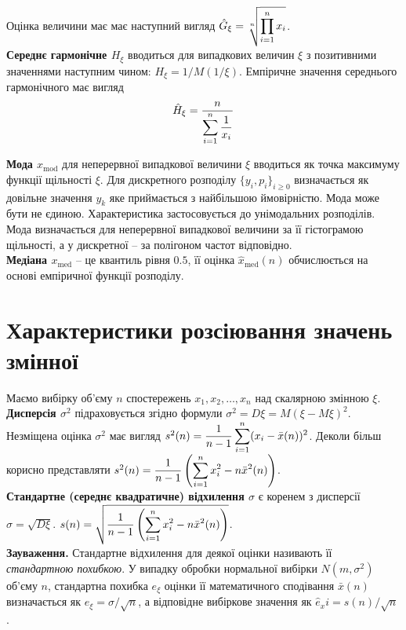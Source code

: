 Оцінка величини має має наступний вигляд $\hat{G}_\xi = \sqrt[n]{\displaystyle\prod\limits_{i=1}^n x_i}$. \\

\textbf{Середнє гармонічне $H_\xi$} вводиться для випадкових величин $\xi$ з позитивними значеннями наступним чином: $H_\xi = 1 / M(1 / \xi)$. Емпіричне значення середнього гармонічного має вигляд \[ \hat{H}_\xi = \dfrac{n}{\displaystyle\sum\limits_{i=1}^n \frac{1}{x_i}} \]

\textbf{Мода $x_{\text{mod}}$} для неперервної випадкової величини $\xi$ вводиться як точка максимуму функції щільності $\xi$. Для дискретного розподілу $\{ y_i, p_i \}_{i \ge 0}$ визначається як довільне значення $y_k$ яке приймається з найбільшою ймовірністю. Мода може бути не єдиною. Характеристика застосовується до унімодальних розподілів. Мода визначається для неперервної випадкової величини за її гістограмою щільності, а у дискретної -- за полігоном частот відповідно.\\

\textbf{Медіана $x_{\text{med}}$} -- це квантиль рівня $0.5$, її оцінка $\hat{x}_{\text{med}}(n)$ обчислюється на основі емпіричної функції розподілу. 

\section{Характеристики розсіювання значень змінної}

Маємо вибірку об'єму $n$ спостережень $x_1, x_2, \ldots, x_n$ над скалярною змінною $\xi$. \\

\textbf{Дисперсія $\sigma^2$} підраховується згідно формули $\sigma^2 = D\xi = M(\xi - M \xi)^2$. Незміщена оцінка $\sigma^2$ має вигляд $s^2(n) = \dfrac{1}{n-1} \displaystyle\sum\limits_{i=1}^n (x_i - \bar{x}(n))^2$. Деколи більш корисно представляти $s^2(n) = \dfrac{1}{n-1} \left(\displaystyle\sum\limits_{i=1}^n x_i^2 - n \bar{x}^2(n)\right)$. \\

\textbf{Стандартне (середнє квадратичне) відхилення $\sigma$} є коренем з дисперсії $\sigma = \sqrt{D \xi}$. $s(n) = \sqrt{\dfrac{1}{n-1} \left(\displaystyle\sum\limits_{i=1}^n x_i^2 - n \bar{x}^2(n)\right)}$. \\

\textbf{Зауваження.} Стандартне відхилення для деякої оцінки називають її \textit{стандартною похибкою}. У випадку обробки нормальної вибірки $N(m, \sigma^2)$ об'єму $n$, стандартна похибка $e_\xi$ оцінки її математичного сподівання $\bar{x}(n)$ визначається як $e_\xi = \sigma / \sqrt{n}$, а відповідне вибіркове значення як $\hat{e}_xi = s(n) / \sqrt{n}$. \\


